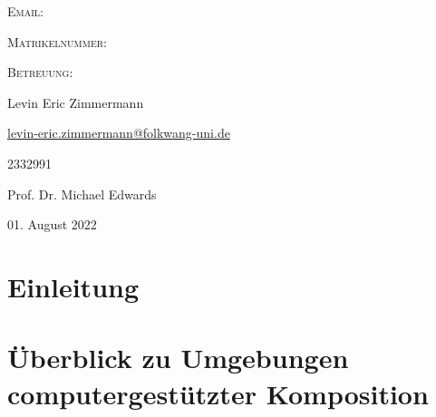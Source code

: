 \documentclass[12pt,a4paper,ngerman]{article}
\newcommand{\mailto}[1]{\href{mailto:#1}{#1}}
\begin{document}
\begin{titlepage}
\begin{minipage}[b]{.25\textwidth}
\begin{flushleft}
\textsc{Email:}

\textsc{Matrikelnummer:}

\textsc{Betreuung:}
\end{flushleft}
\end{minipage}%
\begin{minipage}[b]{.5\textwidth}
\begin{flushleft}
Levin Eric Zimmermann %

{\normalsize \mailto{levin-eric.zimmermann@folkwang-uni.de}}

2332991

Prof. Dr. Michael Edwards
\end{flushleft}
\end{minipage}

\vspace{2cm}



{\large 01. August 2022}\\[2cm] %

\vfill %

\end{titlepage}

\newpage


\tableofcontents


\newpage


\section{Einleitung}


\section{Überblick zu Umgebungen computergestützter Komposition}
\end{document}
